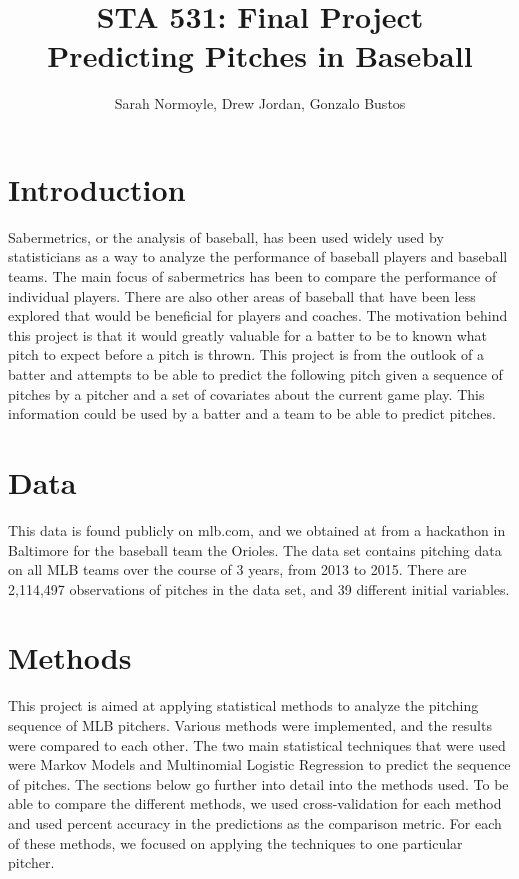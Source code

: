 \documentclass{article}
\begin{document}
\title{STA 531: Final Project \\ Predicting Pitches in Baseball}
\author{Sarah Normoyle, Drew Jordan, Gonzalo Bustos}

\maketitle 

\section{Introduction}

Sabermetrics, or the analysis of baseball, has been used widely used by statisticians as a way to analyze the performance of baseball players and baseball teams. The main focus of sabermetrics has been to compare the performance of individual players. There are also other areas of baseball that have been less explored that would be beneficial for players and coaches. The motivation behind this project is that it would greatly valuable for a batter to be to known what pitch to expect before a pitch is thrown. This project is from the outlook of a batter and attempts to be able to predict the following pitch given a sequence of pitches by a pitcher and a set of covariates about the current game play. This information could be used by a batter and a team to be able to predict pitches. 

\section{Data}

This data is found publicly on mlb.com, and we obtained at from a hackathon in Baltimore for the baseball team the Orioles. The data set contains pitching data on all MLB teams over the course of 3 years, from 2013 to 2015. There are 2,114,497 observations of pitches in the data set, and 39 different initial variables. 


\section{Methods}

This project is aimed at applying statistical methods to analyze the pitching sequence of MLB pitchers. Various methods were implemented, and the results were compared to each other. The two main statistical techniques that were used were Markov Models and Multinomial Logistic Regression to predict the sequence of pitches. The sections below go further into detail into the methods used. To be able to compare the different methods, we used cross-validation for each method and used percent accuracy in the predictions as the comparison metric. For each of these methods, we focused on applying the techniques to one particular pitcher.
\end{document}

